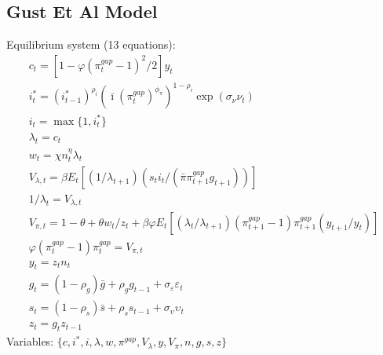 \documentclass[12pt, final]{article}
\begin{document}
\subsection{Gust Et Al Model}
\noindent Equilibrium system (13 equations):
\small\begin{gather}
c_t = [1-\varphi(\pi_t^{gap}-1)^2/2]y_t\\
i_t^*=(i^*_{t-1})^{\rho_i}(\bar{\imath}(\pi^{gap}_t)^{\phi_\pi})^{1-\rho_i}\exp(\sigma_\nu\nu_t)\\
i_t=\max\{1,i_t^*\}\\
\lambda_t = c_t \\
w_t = \chi n_t^\eta \lambda_t\\
V_{\lambda,t} =  \beta E_t[(1/\lambda_{t+1})(s_ti_t/(\bar{\pi}\pi_{t+1}^{gap}g_{t+1}))]\\
1/\lambda_t = V_{\lambda,t}\\
V_{\pi,t} = 1-\theta + \theta w_t/z_t + \beta\varphi E_t[(\lambda_t/\lambda_{t+1})(\pi_{t+1}^{gap}-1)\pi_{t+1}^{gap}(y_{t+1}/y_t)]\\
\varphi(\pi_t^{gap}-1)\pi_t^{gap} = V_{\pi,t}\\
  y_t=z_t n_t\\  
  g_t= (1-\rho_g)\bar{g}+\rho_gg_{t-1} + \sigma_\varepsilon\varepsilon_t \\
  s_t=(1-\rho_s)\bar{s}+\rho_ss_{t-1} + \sigma_\upsilon\upsilon_t\\
  z_t=g_tz_{t-1}
\end{gather}\normalsize
Variables: $\{c,i^*,i,\lambda,w,\pi^{gap},V_{\lambda},y,V_{\pi},n,g,s,z\}$\\
\end{document}
